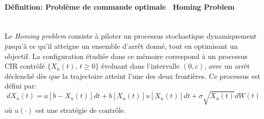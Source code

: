 \paragraph{Définition: Problème de commande optimale \textemdash~Homing Problem}\label{definition_optimal_control}\mbox{}\\
Le \textit{Homing problem} consiste à piloter un processus stochastique dynamiquement jusqu'à ce qu'il atteigne un ensemble d'arrêt donné, tout en optimisant un objectif. La configuration étudiée dans ce mémoire correspond à un processus \acs{CIR} contrôlé \( \{X_u(t),\, t \geq 0\} \) évoluant dans l'intervalle \( (0, c) \), avec un arrêt déclenché dès que la trajectoire atteint l'une des deux frontières. Ce processus est défini par:
\begin{equation}\label{controlled_process}
    dX_u(t) = a[b - X_u(t)]dt + b[X_u(t)]u[X_u(t)]dt + \sigma \sqrt{X_u(t)} dW(t)
\end{equation}
où \( u(\cdot) \) est une stratégie de contrôle.


